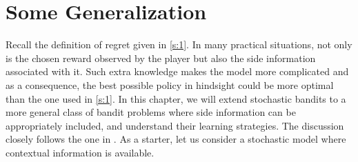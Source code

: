 \documentclass[letterpaper,11pt,openright,openany]{book}
\numberwithin{equation}{section}
\theoremstyle{plain}
\theoremstyle{definition}
\begin{document}
\section{Some Generalization}

Recall the definition of regret given in \eqref{s:1}. In many practical situations, not only is the chosen reward observed by the player but also the side information associated with it.  Such extra knowledge makes the model more complicated and as a consequence, the best possible policy in hindsight could be more optimal than the one used in \eqref{s:1}.  In this chapter, we will extend stochastic bandits to a more general class of bandit problems where side information can be appropriately included, and understand their learning strategies. The discussion closely follows the one in \cite{lattimore2018bandit}. 
As a starter, let us consider a stochastic model where contextual information is available. 
\end{document}
